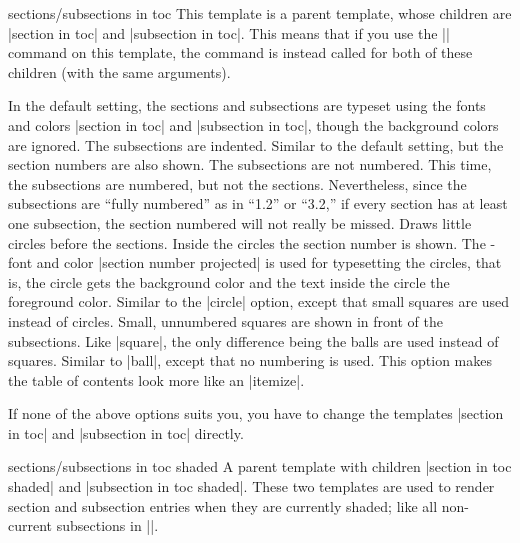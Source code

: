 \begin{command}{\tableofcontents{}}
  \begin{element}{sections/subsections in toc}\yes\no\no
    This template is a parent template, whose children are
    |section in toc| and |subsection in toc|. This means that if you
    use the |\setbeamertemplate| command on this template, the command
    is instead called for both of these children (with the same arguments).

    \begin{templateoptions}
      In the default setting, the sections and subsections are typeset
      using the fonts and colors |section in toc| and
      |subsection in toc|, though the background colors are ignored. The
      subsections are indented.
      Similar to the default setting, but the section numbers are also
      shown. The subsections are not numbered.
      This time, the subsections are numbered, but not the
      sections. Nevertheless, since the subsections are ``fully
      numbered'' as in ``1.2'' or ``3.2,'' if every section has at least
      one subsection, the section numbered will not really be missed.
      Draws little circles before the sections. Inside
      the circles the section number is shown. The \beamer-font and
      color |section number projected| is used for typesetting the
      circles, that is, the circle gets the background color and the
      text inside the circle the foreground color.
      Similar to the |circle| option, except that small squares are
      used instead of circles. Small, unnumbered squares are shown in
      front of the subsections.
      Like |square|, the only difference being the balls are used
      instead of squares.
      Similar to |ball|, except that no numbering is used. This option
      makes the table of contents look more like an |itemize|.
    \end{templateoptions}

    If none of the above options suits you, you have to change the
    templates |section in toc| and |subsection in toc| directly.
  \end{element}

  \begin{element}{sections/subsections in toc shaded}\yes\no\no
    A parent template with children
    |section in toc shaded| and |subsection in toc shaded|. These two
    templates are used to render section and subsection entries when
    they are currently shaded; like all non-current subsections in
    |\tableofcontents[currentsubsection]|. 


\end{element}
\end{command}
